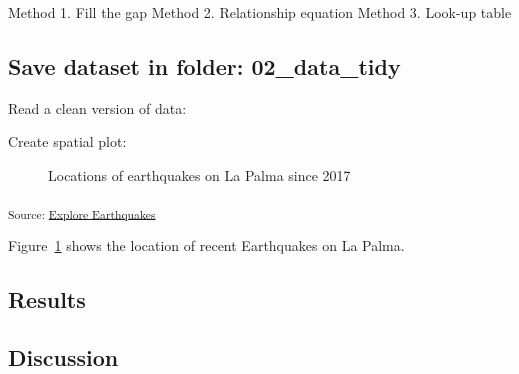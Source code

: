 \documentclass[
]{agujournal2019}
\begin{document}
Method 1. Fill the gap Method 2. Relationship equation Method 3. Look-up
table

\subsection{Save dataset in folder:
02\_data\_tidy}\label{save-dataset-in-folder-02_data_tidy-1}

Read a clean version of data:

Create spatial plot:

\begin{figure}[H]


\caption{\label{fig-spatial-plot}Locations of earthquakes on La Palma
since 2017}

\end{figure}%

\textsubscript{Source:
\href{https://EmouAcademy.github.io/my-awesome-manuscripts/notebooks/01-earthquakes-preview.html\#041ca1bf-04ed-4a8f-986d-dcdf65a9ec4d}{Explore
Earthquakes}}

Figure~\ref{fig-spatial-plot} shows the location of recent Earthquakes
on La Palma.

\subsection{Results}\label{sec-results}

\subsection{Discussion}\label{sec-discussion}
\end{document}
